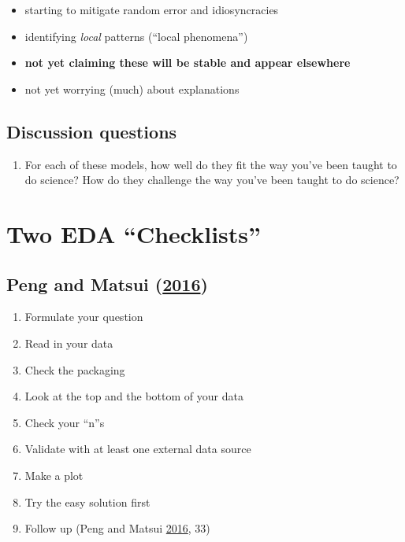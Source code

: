 \documentclass[
]{article}
\providecommand{\tightlist}{%
  \setlength{\itemsep}{0pt}\setlength{\parskip}{0pt}}
\begin{document}
\begin{itemize}
  \begin{itemize}
  \tightlist
  \item
    starting to mitigate random error and idiosyncracies
  \item
    identifying \emph{local} patterns (``local phenomena'')
  \item
    \textbf{not yet claiming these will be stable and appear elsewhere}
  \item
    not yet worrying (much) about explanations
  \end{itemize}
\end{itemize}

\hypertarget{discussion-questions}{%
\subsection{Discussion questions}\label{discussion-questions}}

\begin{enumerate}
\def\labelenumi{\arabic{enumi}.}
\tightlist
\item
  For each of these models, how well do they fit the way you've been taught to do science? How do they challenge the way you've been taught to do science?
\end{enumerate}

\hypertarget{two-eda-checklists}{%
\section{Two EDA ``Checklists''}\label{two-eda-checklists}}

\hypertarget{pengartdatascience2016}{%
\subsection{\texorpdfstring{Peng and Matsui (\protect\hyperlink{ref-PengArtDataScience2016}{2016})}{Peng and Matsui (2016)}}\label{pengartdatascience2016}}

\begin{enumerate}
\def\labelenumi{\arabic{enumi}.}
\tightlist
\item
  Formulate your question
\item
  Read in your data
\item
  Check the packaging
\item
  Look at the top and the bottom of your data
\item
  Check your ``n''s
\item
  Validate with at least one external data source
\item
  Make a plot
\item
  Try the easy solution first
\item
  Follow up (Peng and Matsui \protect\hyperlink{ref-PengArtDataScience2016}{2016}, 33)
\end{enumerate}
\end{document}

